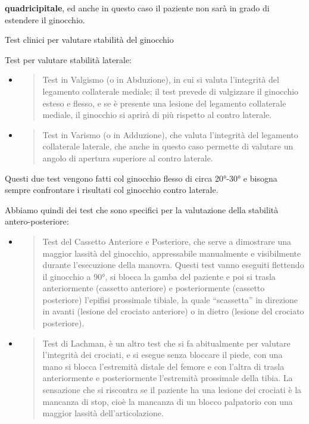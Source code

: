\documentclass[]{article}
\begin{document}
\textbf{quadricipitale}, ed anche in questo caso il paziente non sarà in
grado di estendere il ginocchio.

Test clinici per valutare stabilità del ginocchio

Test per valutare stabilità laterale:

\begin{itemize}
\item
  \begin{quote}
  Test in Valgismo (o in Abduzione), in cui si valuta l'integrità del
  legamento collaterale mediale; il test prevede di valgizzare il
  ginocchio esteso e flesso, e se è presente una lesione del legamento
  collaterale mediale, il ginocchio si aprirà di più rispetto al contro
  laterale.
  \end{quote}
\item
  \begin{quote}
  Test in Varismo (o in Adduzione), che valuta l'integrità del legamento
  collaterale laterale, che anche in questo caso permette di valutare un
  angolo di apertura superiore al contro laterale.
  \end{quote}
\end{itemize}

Questi due test vengono fatti col ginocchio flesso di circa 20°-30° e
bisogna sempre confrontare i risultati col ginocchio contro laterale.

Abbiamo quindi dei test che sono specifici per la valutazione della
stabilità antero-posteriore:

\begin{itemize}
\item
  \begin{quote}
  Test del Cassetto Anteriore e Posteriore, che serve a dimostrare una
  maggior lassità del ginocchio, appressabile manualmente e visibilmente
  durante l'esecuzione della manovra. Questi test vanno eseguiti
  flettendo il ginocchio a 90°, si blocca la gamba del paziente e poi si
  trasla anteriormente (cassetto anteriore) e posteriormente (cassetto
  posteriore) l'epifisi prossimale tibiale, la quale ``scassetta'' in
  direzione in avanti (lesione del crociato anteriore) o in dietro
  (lesione del crociato posteriore).
  \end{quote}
\item
  \begin{quote}
  Test di Lachman, è un altro test che si fa abitualmente per valutare
  l'integrità dei crociati, e si esegue senza bloccare il piede, con una
  mano si blocca l'estremità distale del femore e con l'altra di trasla
  anteriormente e posteriormente l'estremità prossimale della tibia. La
  sensazione che si riscontra se il paziente ha una lesione dei crociati
  è la mancanza di stop, cioè la mancanza di un blocco palpatorio con
  una maggior lassità dell'articolazione.
  \end{quote}
\end{itemize}
\end{document}
